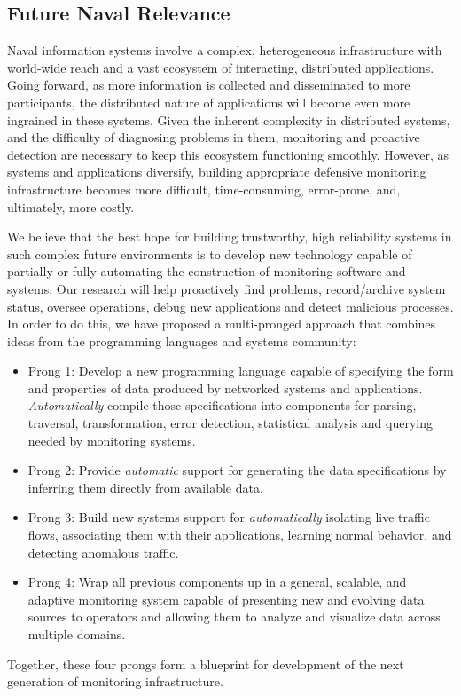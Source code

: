 \subsection{Future Naval Relevance}
\label{sec:naval}

Naval information systems involve a complex, heterogeneous
infrastructure with world-wide reach and a vast ecosystem of
interacting, distributed applications. Going forward, as more
information is collected and disseminated to more participants, the
distributed nature of applications will become even more ingrained in
these systems. Given the inherent complexity in distributed systems,
and the difficulty of diagnosing problems in them, monitoring and
proactive detection are necessary to keep this ecosystem functioning
smoothly.  However, as systems and applications diversify, building
appropriate defensive monitoring infrastructure becomes more
difficult, time-consuming, error-prone, and, ultimately, more costly.

We believe that the best hope for building trustworthy, high
reliability systems in such complex future environments is to develop
new technology capable of partially or fully automating the
construction of monitoring software and systems.  Our research will
help proactively find problems, record/archive system status, oversee
operations, debug new applications and detect malicious processes.  In
order to do this, we have proposed a multi-pronged approach that
combines ideas from the programming languages and systems community:

\begin{itemize}
\item Prong 1:  Develop a new programming language capable of specifying the 
form and properties of data produced by networked systems and 
applications.  {\em Automatically} compile those specifications into 
components for parsing, traversal, transformation, error detection,
statistical analysis and querying needed by monitoring systems.

\item Prong 2:  Provide {\em automatic} support for generating the data 
specifications by inferring them directly from available data.

\item Prong 3:  Build new systems support for {\em automatically}
isolating live traffic flows, associating them with their applications,
learning normal behavior, and detecting anomalous traffic.

\item Prong 4:  Wrap all previous components up in a general, scalable,
and adaptive monitoring system capable of
presenting new and evolving data sources to operators and allowing them to
analyze and visualize data across multiple domains.
\end{itemize}

Together, these four prongs form a blueprint for development of the
next generation of monitoring infrastructure.